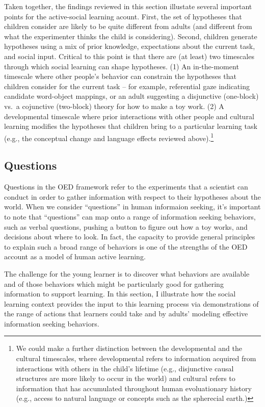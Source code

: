 \documentclass[english,floatsintext,man]{apa6}
\theoremstyle{definition}
\theoremstyle{definition}
\theoremstyle{definition}
\theoremstyle{remark}
\begin{document}
Taken together, the findings reviewed in this section illustate several
important points for the active-social learning acount. First, the set
of hypotheses that children consider are likely to be quite different
from adults (and different from what the experimenter thinks the child
is considering). Second, children generate hypotheses using a mix of
prior knowledge, expectations about the current task, and social input.
Critical to this point is that there are (at least) two timescales
through which social learning can shape hypotheses. (1) An in-the-moment
timescale where other people's behavior can constrain the hypotheses
that children consider for the current task -- for example, referential
gaze indicating candidate word-object mappings, or an adult suggesting a
disjunctive (one-block) vs.~a cojunctive (two-block) theory for how to
make a toy work. (2) A developmental timescale where prior interactions
with other people and cultural learning modifies the hypotheses that
children bring to a particular learning task (e.g., the conceptual
change and language effects reviewed above).\footnote{We could make a
  further distinction between the developmental and the cultural
  timescales, where developmental refers to information acquired from
  interactions with others in the child's lifetime (e.g., disjunctive
  causal structures are more likely to occur in the world) and cultural
  refers to information that has accumulated throughout human
  evoluationary history (e.g., access to natural language or concepts
  such as the spherecial earth.)}

\subsection{Questions}\label{questions}

Questions in the OED framework refer to the experiments that a scientist
can conduct in order to gather information with respect to their
hypotheses about the world. When we consider \enquote{questions} in
human informaion seeking, it's important to note that
\enquote{questions} can map onto a range of information seeking
behaviors, such as verbal questions, pushing a button to figure out how
a toy works, and decisions about where to look. In fact, the capacity to
provide general principles to explain such a broad range of behaviors is
one of the strengths of the OED account as a model of human active
learning.

The challenge for the young learner is to discover what behaviors are
available and of those behaviors which might be particularly good for
gathering information to support learning. In this section, I illustrate
how the social learning context provides the input to this learning
process via demonstrations of the range of actions that learners could
take and by adults' modeling effective information seeking behaviors.
\end{document}
